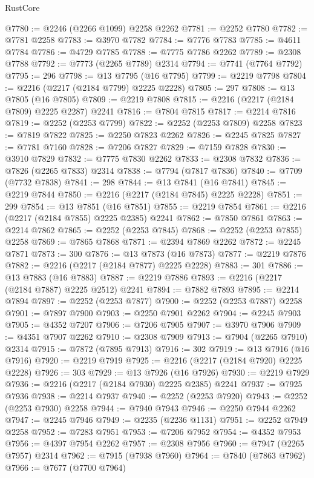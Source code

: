 \begin{lexlean}{RustCore}
\begin{coremodule}
@7780 := @2246 (@2266 @1099) @2258 @2262
@7781 := @2252 @7780
@7782 := @7781 @2258
@7783 := @3970 @7782
@7784 := @7776 @7783
@7785 := @4611 @7784
@7786 := @4729 @7785
@7788 := @7775 @7786 @2262
@7789 := @2308 @7788
@7792 := @7773 (@2265 @7789) @2314
@7794 := @7741 (@7764 @7792)
@7795 := 296
@7798 := @13 @7795 (@16 @7795)
@7799 := @2219 @7798
@7804 := @2216 (@2217 (@2184 @7799) @2225 @2228)
@7805 := 297
@7808 := @13 @7805 (@16 @7805)
@7809 := @2219 @7808
@7815 := @2216 (@2217 (@2184 @7809) @2225 @2287) @2241
@7816 := @7804 @7815
@7817 := @2214 @7816
@7819 := @2252 (@2253 @7799)
@7822 := @2252 (@2253 @7809) @2258
@7823 := @7819 @7822
@7825 := @2250 @7823 @2262
@7826 := @2245 @7825
@7827 := @7781 @7160
@7828 := @7206 @7827
@7829 := @7159 @7828
@7830 := @3910 @7829
@7832 := @7775 @7830 @2262
@7833 := @2308 @7832
@7836 := @7826 (@2265 @7833) @2314
@7838 := @7794 (@7817 @7836)
@7840 := @7709 (@7732 @7838)
@7841 := 298
@7844 := @13 @7841 (@16 @7841)
@7845 := @2219 @7844
@7850 := @2216 (@2217 (@2184 @7845) @2225 @2228)
@7851 := 299
@7854 := @13 @7851 (@16 @7851)
@7855 := @2219 @7854
@7861 := @2216 (@2217 (@2184 @7855) @2225 @2385) @2241
@7862 := @7850 @7861
@7863 := @2214 @7862
@7865 := @2252 (@2253 @7845)
@7868 := @2252 (@2253 @7855) @2258
@7869 := @7865 @7868
@7871 := @2394 @7869 @2262
@7872 := @2245 @7871
@7873 := 300
@7876 := @13 @7873 (@16 @7873)
@7877 := @2219 @7876
@7882 := @2216 (@2217 (@2184 @7877) @2225 @2228)
@7883 := 301
@7886 := @13 @7883 (@16 @7883)
@7887 := @2219 @7886
@7893 := @2216 (@2217 (@2184 @7887) @2225 @2512) @2241
@7894 := @7882 @7893
@7895 := @2214 @7894
@7897 := @2252 (@2253 @7877)
@7900 := @2252 (@2253 @7887) @2258
@7901 := @7897 @7900
@7903 := @2250 @7901 @2262
@7904 := @2245 @7903
@7905 := @4352 @7207
@7906 := @7206 @7905
@7907 := @3970 @7906
@7909 := @4351 @7907 @2262
@7910 := @2308 @7909
@7913 := @7904 (@2265 @7910) @2314
@7915 := @7872 (@7895 @7913)
@7916 := 302
@7919 := @13 @7916 (@16 @7916)
@7920 := @2219 @7919
@7925 := @2216 (@2217 (@2184 @7920) @2225 @2228)
@7926 := 303
@7929 := @13 @7926 (@16 @7926)
@7930 := @2219 @7929
@7936 := @2216 (@2217 (@2184 @7930) @2225 @2385) @2241
@7937 := @7925 @7936
@7938 := @2214 @7937
@7940 := @2252 (@2253 @7920)
@7943 := @2252 (@2253 @7930) @2258
@7944 := @7940 @7943
@7946 := @2250 @7944 @2262
@7947 := @2245 @7946
@7949 := @2235 (@2236 @1131)
@7951 := @2252 @7949 @2258
@7952 := @7283 @7951
@7953 := @7206 @7952
@7954 := @4352 @7953
@7956 := @4397 @7954 @2262
@7957 := @2308 @7956
@7960 := @7947 (@2265 @7957) @2314
@7962 := @7915 (@7938 @7960)
@7964 := @7840 (@7863 @7962)
@7966 := @7677 (@7700 @7964)

\end{coremodule}
\end{lexlean}
